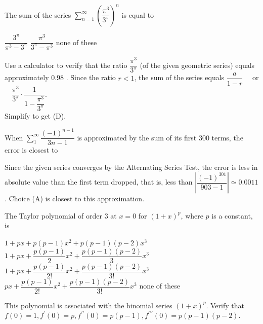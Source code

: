 \newpage




\question
The sum of the series $\sum\limits_{n=1}^{\infty}\left(\dfrac{\pi^{3}}{3^{\pi}}\right)^{n}$ is equal to
\begin{choices}
  \choice $\dfrac{3^{\pi}}{\pi^{3}-3^{\pi}}$
  \CorrectChoice $\dfrac{\pi^{3}}{3^{\pi}-\pi^{3}}$
  \choice none of these
\end{choices}
\begin{solution}
Use a calculator to verify that the ratio $\dfrac{\pi^{3}}{3^{\pi}}$ (of the given geometric series) equals approximately 0.98 . Since the ratio $r<1$, the sum of the series equals $\dfrac{a}{1-r} \quad$ or $\quad \dfrac{\pi^{3}}{3^{\pi}} \cdot \dfrac{1}{1-\dfrac{\pi^{3}}{3^{\pi}}}$.\\
Simplify to get (D).
\end{solution}

\question
When $\sum\limits_{1}^{\infty} \dfrac{(-1)^{n-1}}{3 n-1}$ is approximated by the sum of its first 300 terms, the error is closest to
\begin{choices}
\end{choices}
\begin{solution}
Since the given series converges by the Alternating Series Test, the error is less in absolute value than the first term dropped, that is, less than $\left|\dfrac{(-1)^{301}}{903-1}\right| \simeq 0.0011$. Choice (A) is closest to this approximation.
\end{solution}

\question
The Taylor polynomial of order 3 at $x=0$ for $(1+x)^{p}$, where $p$ is a constant, is
\begin{choices}
  \choice $1+p x+p(p-1) x^{2}+p(p-1)(p-2) x^{3}$
  \choice $1+p x+\dfrac{p(p-1)}{2} x^{2}+\dfrac{p(p-1)(p-2)}{3} x^{3}$
  \CorrectChoice $1+p x+\dfrac{p(p-1)}{2!} x^{2}+\dfrac{p(p-1)(p-2)}{3!} x^{3}$
  \choice $p x+\dfrac{p(p-1)}{2!} x^{2}+\dfrac{p(p-1)(p-2)}{3!} x^{3}$
  \choice none of these
\end{choices}
\begin{solution}
This polynomial is associated with the binomial series $(1+x)^{p}$. Verify that $f(0)=1, f^{\prime}(0)=p, f^{\prime \prime}(0)=p(p-1), f^{\prime \prime \prime}(0)=p(p-1)(p-2)$.
\end{solution}



\newpage




